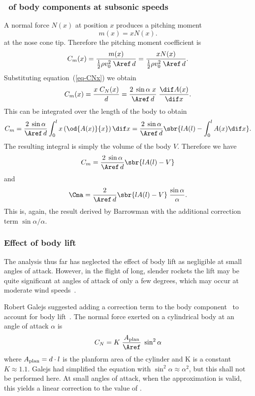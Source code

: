 \subsubsection{\Cma\ of body components at subsonic speeds}

A normal force $N(x)$ at position $x$ produces a pitching moment
%
\begin{equation}
m(x) = xN(x).
\end{equation}
%
at the nose cone tip.  Therefore the pitching moment coefficient is
%
\begin{equation}
C_m(x) = \frac{m(x)}{\frac{1}{2}\rho v_0^2\;\Aref\, d}
       = \frac{xN(x)}{\frac{1}{2}\rho v_0^2\;\Aref\, d}.
\end{equation}
%
Substituting equation~(\ref{eq-CNx}) we obtain
%
\begin{equation}
C_m(x) = \frac{x\;C_N(x)}{d}
       = \frac{2\; \sin\alpha\; x}{\Aref\, d}\; \frac{\dif A(x)}{\dif x}.
\end{equation}
%
This can be integrated over the length of the body to obtain
%
\begin{equation}
C_m = \frac{2\;\sin\alpha}{\Aref\,d}
        \int_0^l x \left(\od{A(x)}{x}\right) \dif x
    = \frac{2\;\sin\alpha}{\Aref\,d}
        \sbr{ lA(l)-\int_0^l A(x) \dif x }.
\end{equation}
%
The resulting integral is simply the volume of the body $V$.
Therefore we have
%
\begin{equation}
C_m = \frac{2\;\sin\alpha}{\Aref\,d} \sbr{ lA(l)-V }
\end{equation}
%
and
%
\begin{equation}
\Cma = \frac{2}{\Aref\,d}\sbr{ lA(l)-V }\; \frac{\sin\alpha}{\alpha}.
\label{eq-body-Cma}
\end{equation}
%
This is, again, the result derived by Barrowman with the additional
correction term $\sin\alpha/\alpha$.


\subsubsection{Effect of body lift}
\label{sec-body-lift}

The analysis thus far has neglected the effect of body lift as
negligible at small angles of attack.  However, in the flight of long,
slender rockets the lift may be quite significant at angles of attack
of only a few degrees, which may occur at moderate wind
speeds~\cite{galejs}.

Robert Galejs suggested adding a correction term to the body
component \CNa\ to account for body lift~\cite{galejs}.  The normal
force exerted on a cylindrical body at an angle of attack $\alpha$
is~\cite[p.~3-11]{hoerner}
%
\begin{equation}
C_N = K\; \frac{A_{\rm plan}}{\Aref}\; \sin^2\alpha
\end{equation}
%
where $A_{\rm plan} = d\cdot l$ is the planform area of the cylinder
and K is a constant $K\approx 1.1$.  Galejs had simplified the
equation with $\sin^2\alpha\approx\alpha^2$, but this shall not be
performed here.  At small angles of attack, when the approximation is
valid, this yields a linear correction to the value of \CNa.


